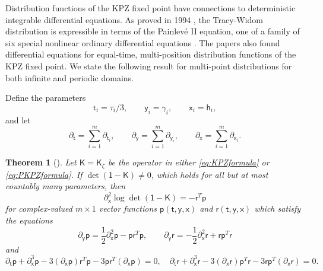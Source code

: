 \documentclass[10pt]{article}
\theoremstyle{plain}
\newtheorem{theorem}{Theorem}[section]
\theoremstyle{definition}
\newcommand{\beq}{ \begin{equation} }
\newcommand{\eeq}{ \end{equation} }
\newcommand{\beqq}{ \begin{equation*} }
\newcommand{\eeqq}{ \end{equation*} }
\newcommand{\kmath}{\mathsf}  %
\newcommand{\kt}{\tau} %
\newcommand{\kga}{\gamma} %
\newcommand{\kh}{\kmath{h}}  %
\newcommand{\kid}{\kmath{1}}  %
\newcommand{\kK}{\kmath{K}}  %
\newcommand{\kp}{\kmath{p}}  %
\newcommand{\kr}{\kmath{r}}  %
\newcommand{\knt}{\kmath{t}}  %
\newcommand{\kny}{\kmath{y}}  %
\newcommand{\knx}{\kmath{x}}  %
\numberwithin{equation}{section}
\begin{document}
Distribution functions of the KPZ fixed point have connections to deterministic integrable differential equations. 
As proved in 1994 \cite{Tracy-Widom94}, the Tracy-Widom distribution is expressible in terms of the Painlev\'e II equation, one of a family of six special nonlinear ordinary differential equations  \cite{Fokas-Its-Kitaev-Novokshenov06}. 
The papers \cite{Tracy-Widom03, Adler-van_Moerbeke05, Wang08a, Bertola-Cafasso-2012b, Quastel-Remenik19b} also found differential equations for equal-time, multi-position distribution functions of the KPZ fixed point. 
We state the following result for multi-point distributions for both infinite and periodic domains. %


Define the parameters
\beqq
	\knt_i= \kt_i/3, %
	\qquad \kny_i=\kga_i, %
	\qquad \knx_i= \kh_i, 
\eeqq
and let
\beqq
	\partial_{\knt}= \sum_{i=1}^m \partial_{\knt_i}, \qquad
	\partial_{\kny}= \sum_{i=1}^m \partial_{\kny_i}, \qquad
	\partial_{\knx}= \sum_{i=1}^m \partial_{\knx_i}. 
\eeqq

\begin{theorem}[\cite{Baik-Liu-Silva20, Baik-Prokhorov-Silva21}] \label{thm:mKdV}
Let $\kK=\kK_\zeta$ be the operator in either \eqref{eq:KPZformula} or \eqref{eq:PKPZformula}. 
If $\det(\kid- \kK)\neq 0$, which holds for all but at most countably many parameters, then 
\beqq
	\partial^2_{\knx} \log \det(\kid- \kK) = - \kr^T\kp
\eeqq
for complex-valued $m\times 1$ vector functions $\kp(\knt, \kny, \knx)$ and $\kr(\knt, \kny, \knx)$ which satisfy the equations
\beq \label{eq:NLS}
	\partial_{\kny} \kp = \frac12 \partial_{\knx}^2 \kp -  \kp \kr^T \kp, \qquad
	\partial_{\kny} \kr = -\frac12 \partial_{\knx}^2 \kr +  \kr \kp^T \kr
\eeq
and  
\beq \label{eq:mKdV}
	\partial_{\knt} \kp + \partial_{\knx}^3 \kp - 3 (\partial_{\knx} \kp) \kr^T \kp  - 3 \kp \kr^T (\partial_{\knx} \kp) =0 , \quad
	\partial_{\knt} \kr + \partial_{\knx}^3 \kr - 3  (\partial_{\knx} \kr) \kp^T \kr -  3 \kr \kp^T (\partial_{\knx} \kr ) =0. 
\eeq
\end{theorem}
\end{document}
